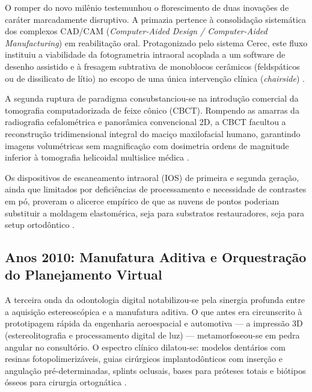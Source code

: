 O romper do novo milênio testemunhou o florescimento de duas inovações de caráter marcadamente disruptivo. A primazia pertence à consolidação sistemática dos complexos CAD/CAM (\textit{Computer-Aided Design / Computer-Aided Manufacturing}) em reabilitação oral. Protagonizado pelo sistema Cerec, este fluxo instituiu a viabilidade da fotogrametria intraoral acoplada a um software de desenho assistido e à fresagem subtrativa de monoblocos cerâmicos (feldspáticos ou de dissilicato de lítio) no escopo de uma única intervenção clínica (\textit{chairside}) \cite{alshadidi2024surface}.

A segunda ruptura de paradigma consubstanciou-se na introdução comercial da tomografia computadorizada de feixe cônico (CBCT). Rompendo as amarras da radiografia cefalométrica e panorâmica convencional 2D, a CBCT facultou a reconstrução tridimensional integral do maciço maxilofacial humano, garantindo imagens volumétricas sem magnificação com dosimetria ordens de magnitude inferior à tomografia helicoidal multislice médica \cite{li2025impacts}.

Os dispositivos de escaneamento intraoral (IOS) de primeira e segunda geração, ainda que limitados por deficiências de processamento e necessidade de contrastes em pó, proveram o alicerce empírico de que as nuvens de pontos poderiam substituir a moldagem elastomérica, seja para substratos restauradores, seja para setup ortodôntico \cite{li2024aligner}. 

\subsection*{Anos 2010: Manufatura Aditiva e Orquestração do Planejamento Virtual}

A terceira onda da odontologia digital notabilizou-se pela sinergia profunda entre a aquisição estereoscópica e a manufatura aditiva. O que antes era circunscrito à prototipagem rápida da engenharia aeroespacial e automotiva — a impressão 3D (estereolitografia e processamento digital de luz) — metamorfoseou-se em pedra angular no consultório. O espectro clínico dilatou-se: modelos dentários com resinas fotopolimerizáveis, guias cirúrgicos implantodônticos com inserção e angulação pré-determinadas, splints oclusais, bases para próteses totais e biótipos ósseos para cirurgia ortognática \cite{techsoc2025precision}.

